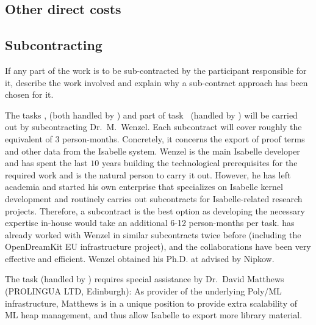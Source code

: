 \wpfigstyle{\scriptsize\setlength{\tabcolsep}{2pt}}
\wpfig%

\subsection{Other direct costs}

\subsection{Subcontracting}\label{sec:subcontracting}

\begin{todo}{}\color{red}
  If any part of the work is to be sub-contracted by the participant
  responsible for it, describe the work involved and explain why a
  sub-contract approach has been chosen for it.
\end{todo}

The tasks ,
 (both handled by ) and part of
task~ (handled by ) will
be carried out by subcontracting Dr.\ M.\ Wenzel.  Each subcontract
will cover roughly the equivalent of $3$ person-months.  Concretely,
it concerns the export of proof terms and other data from the Isabelle
system.  Wenzel is the main Isabelle developer and has spent the
last $10$ years building the technological prerequisites for the
required work and is the natural person to carry it out.  However, he
has left academia and started his own enterprise that specializes on
Isabelle kernel development and routinely carries out subcontracts for
Isabelle-related research projects.  Therefore, a subcontract is the
best option as developing the necessary expertise in-house would take
an additional 6-12 person-months per task.   has already worked with
Wenzel in similar subcontracts twice before (including the
OpenDreamKit EU infrastructure project), and the collaborations have
been very effective and efficient. Wenzel obtained his Ph.D. at
 advised by Nipkow.

The task  (handled by )
requires special assistance by Dr.\ David Matthews (PROLINGUA LTD,
Edinburgh): As provider of the underlying Poly/ML infrastructure,
Matthews is in a unique position to provide extra scalability of ML
heap management, and thus allow Isabelle to export more library
material.


